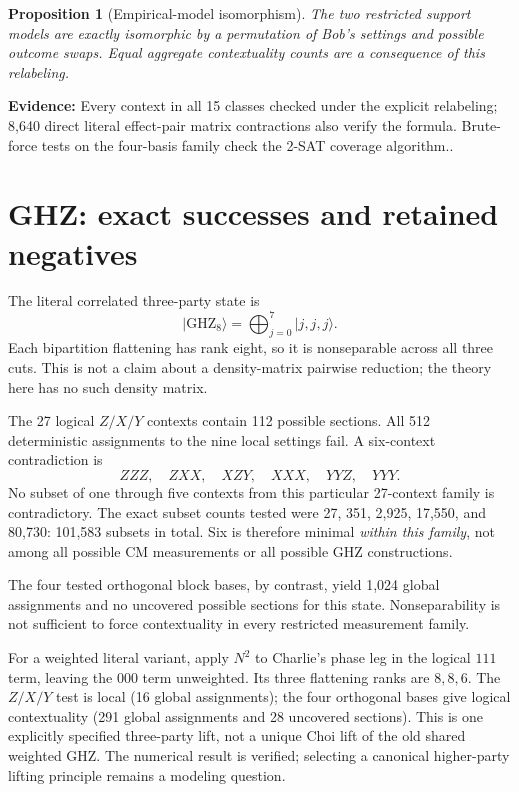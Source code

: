 \documentclass[11pt,a4paper]{article}
\newtheorem{proposition}[theorem]{Proposition}
\theoremstyle{definition}\newtheorem{definition}[theorem]{Definition}
\newcommand{\ket}[1]{\lvert #1\rangle}
\newcommand{\ev}[1]{\textbf{Evidence:} #1.}
\begin{document}
\begin{proposition}[Empirical-model isomorphism]
The two restricted support models are exactly isomorphic by a permutation of Bob's settings and possible outcome swaps. Equal aggregate contextuality counts are a consequence of this relabeling.
\end{proposition}
\ev{Every context in all 15 classes checked under the explicit relabeling; 8,640 direct literal effect-pair matrix contractions also verify the formula. Brute-force tests on the four-basis family check the 2-SAT coverage algorithm.}

\section{GHZ: exact successes and retained negatives}
The literal correlated three-party state is
\[
 \ket{\mathrm{GHZ}_8}=\bigoplus_{j=0}^{7}\ket{j,j,j}.
\]
Each bipartition flattening has rank eight, so it is nonseparable across all three cuts. This is not a claim about a density-matrix pairwise reduction; the theory here has no such density matrix.

The 27 logical $Z/X/Y$ contexts contain 112 possible sections. All 512 deterministic assignments to the nine local settings fail. A six-context contradiction is
\[
 ZZZ,\quad ZXX,\quad XZY,\quad XXX,\quad YYZ,\quad YYY.
\]
No subset of one through five contexts from this particular 27-context family is contradictory. The exact subset counts tested were 27, 351, 2,925, 17,550, and 80,730: 101,583 subsets in total. Six is therefore minimal \emph{within this family}, not among all possible CM measurements or all possible GHZ constructions.

The four tested orthogonal block bases, by contrast, yield 1,024 global assignments and no uncovered possible sections for this state. Nonseparability is not sufficient to force contextuality in every restricted measurement family.

For a weighted literal variant, apply $N^2$ to Charlie's phase leg in the logical $111$ term, leaving the $000$ term unweighted. Its three flattening ranks are $8,8,6$. The $Z/X/Y$ test is local (16 global assignments); the four orthogonal bases give logical contextuality (291 global assignments and 28 uncovered sections). This is one explicitly specified three-party lift, not a unique Choi lift of the old shared weighted GHZ. The numerical result is verified; selecting a canonical higher-party lifting principle remains a modeling question.
\end{document}
